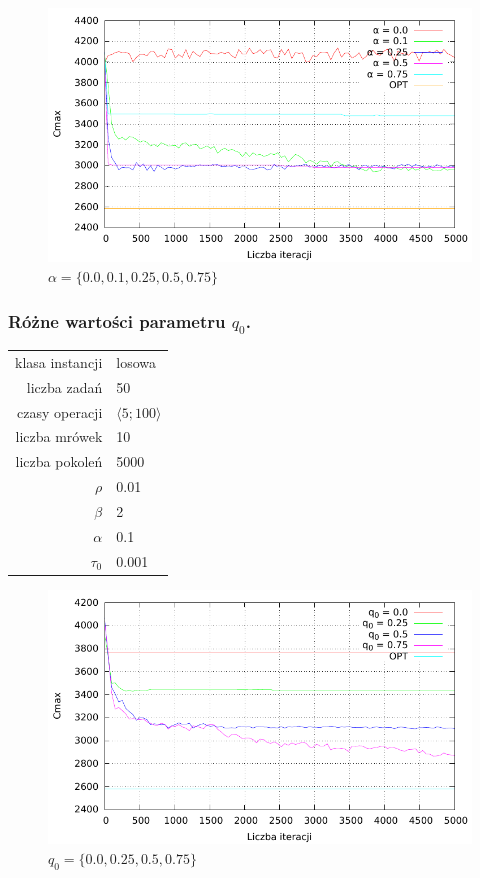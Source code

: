 \documentclass[10pt,a4paper]{article}
\begin{document}
\begin{figure}[h]
    \centering
    \includegraphics{./figures/inst01_rnd_alpha_smooth.pdf}
    \caption{$ \alpha = \{ 0.0, 0.1, 0.25, 0.5, 0.75 \} $}
\end{figure}
\vspace{15mm}


\newpage
\subsubsection{Różne wartości parametru $q_0$.}
\vspace{6 mm}
\begin{center}
\begin{tabular}{|r|l|}
  \hline
  klasa instancji & losowa \\
  liczba zadań & 50 \\
  czasy operacji & $ \langle 5;100 \rangle $  \\
  liczba mrówek & 10 \\
  liczba pokoleń & 5000 \\
  $ \rho $ & 0.01 \\
  $ \beta $ & 2 \\
  $ \alpha $ & 0.1 \\
  $ \tau_0 $ & 0.001 \\
  \hline
\end{tabular}
\end{center}

\begin{figure}[h]
    \centering
    \includegraphics{./figures/inst01_rnd_qinit_smooth.pdf}
    \caption{$ q_0 = \{ 0.0, 0.25, 0.5, 0.75 \} $}
\end{figure}
\end{document}
